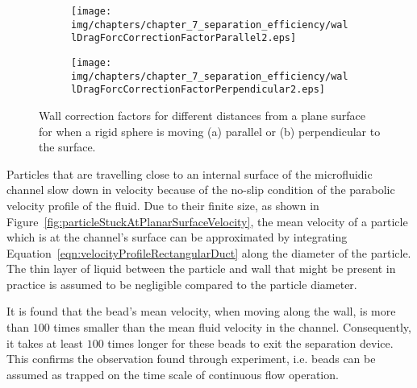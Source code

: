 \begin{figure}[htb]
        \centering
        \begin{subfigure}[b]{0.48\textwidth}
                \texttt{[image: img/chapters/chapter\_7\_separation\_efficiency/wallDragForcCorrectionFactorParallel2.eps]}
                \caption{}
                \label{fig:wallCorrectionFactorsParallel}
        \end{subfigure}     
        \hfill                   
        \begin{subfigure}[b]{0.48\textwidth}
                \texttt{[image: img/chapters/chapter\_7\_separation\_efficiency/wallDragForcCorrectionFactorPerpendicular2.eps]}
                \caption{}
                \label{fig:wallCorrectionFactorsPerpendicular}
        \end{subfigure}         
        \caption[Wall correction factor for rigid sphere in proximity to a planar wall]{Wall correction factors for different distances from a plane surface for when a rigid sphere is moving (a) parallel or (b) perpendicular to the surface.}
        \label{fig:wallCorrectionFactors}
\end{figure}

Particles that are travelling close to an internal surface of the microfluidic channel slow down in velocity because of the no-slip condition of the parabolic velocity profile of the fluid. Due to their finite size, as shown in Figure~\ref{fig:particleStuckAtPlanarSurfaceVelocity}, the mean velocity of a particle which is at the channel's surface can be approximated by integrating Equation~\ref{eqn:velocityProfileRectangularDuct} along the diameter of the particle. The thin layer of liquid between the particle and wall that might be present in practice is assumed to be negligible compared to the particle diameter.

It is found that the bead's mean velocity, when moving along the wall, is more than $100$ times smaller than the mean fluid velocity in the channel. Consequently, it takes at least $100$ times longer for these beads to exit the separation device. This confirms the observation found through experiment, i.e. beads can be assumed as trapped on the time scale of continuous flow operation.

